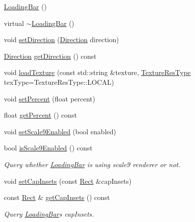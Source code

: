 \begin{DoxyCompactItemize}
\item 
\hyperlink{classui_1_1LoadingBar_a2cb2c133940150cd97088ef50596ce2d}{Loading\+Bar} ()
\item 
virtual \hyperlink{classui_1_1LoadingBar_a9627ee395977c7147dd91a18282d4266}{$\sim$\+Loading\+Bar} ()
\item 
void \hyperlink{classui_1_1LoadingBar_a66c628ef4dd8a717f7a5fad13f9306a9}{set\+Direction} (\hyperlink{classui_1_1LoadingBar_a4407b3ce72891a78755e25d765e25063}{Direction} direction)
\item 
\hyperlink{classui_1_1LoadingBar_a4407b3ce72891a78755e25d765e25063}{Direction} \hyperlink{classui_1_1LoadingBar_ab73ebf55cb97d33a82428f96923969ca}{get\+Direction} () const
\item 
void \hyperlink{classui_1_1LoadingBar_a72f581d7571f9e592ae91a73657a4862}{load\+Texture} (const std\+::string \&texture, \hyperlink{classui_1_1Widget_a040a65ec5ad3b11119b7e16b98bd9af0}{Texture\+Res\+Type} tex\+Type=Texture\+Res\+Type\+::\+L\+O\+C\+AL)
\item 
void \hyperlink{classui_1_1LoadingBar_ad26d11482f885dab57b56885bfed52d3}{set\+Percent} (float percent)
\item 
float \hyperlink{classui_1_1LoadingBar_a8a0ce53c7f26ef008cd31873eea7889b}{get\+Percent} () const
\item 
void \hyperlink{classui_1_1LoadingBar_adbc9e1eb4d8bb1881d37506443f1ee6d}{set\+Scale9\+Enabled} (bool enabled)
\item 
bool \hyperlink{classui_1_1LoadingBar_ad7069c89d7947232a990799256ebabf2}{is\+Scale9\+Enabled} () const
\begin{DoxyCompactList}\small\item\em Query whether \hyperlink{classui_1_1LoadingBar}{Loading\+Bar} is using scale9 renderer or not. \end{DoxyCompactList}\item 
void \hyperlink{classui_1_1LoadingBar_aa639bb577b731423bfce094995c61706}{set\+Cap\+Insets} (const \hyperlink{classRect}{Rect} \&cap\+Insets)
\item 
const \hyperlink{classRect}{Rect} \& \hyperlink{classui_1_1LoadingBar_a3772db031f6d8f24d6c13868e3bcaf47}{get\+Cap\+Insets} () const
\begin{DoxyCompactList}\small\item\em Query \hyperlink{classui_1_1LoadingBar}{Loading\+Bar}\textquotesingle{}s cap\+Insets. \end{DoxyCompactList}\item 

\end{DoxyCompactItemize}
